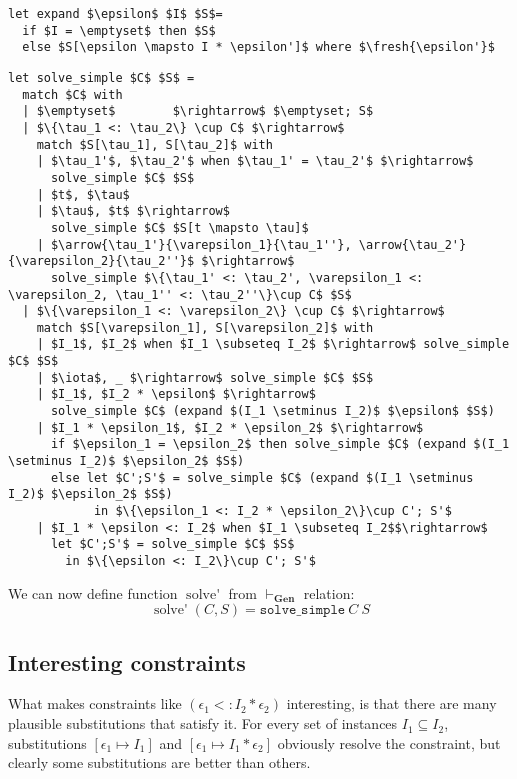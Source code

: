 \documentclass[declaration,shortabstract]{iithesis}
\theoremstyle{definition} \newtheorem{definition}{Definition}[section]
\newcommand{\arrow}[3]{{#1}\rightarrow_{#2}{#3}}
\newcommand{\fresh}[1]{\ensuremath{\operatorname{fresh}({#1})}}
\begin{document}
\begin{lstlisting}
let expand $\epsilon$ $I$ $S$= 
  if $I = \emptyset$ then $S$
  else $S[\epsilon \mapsto I * \epsilon']$ where $\fresh{\epsilon'}$
\end{lstlisting}
\begin{lstlisting}
let solve_simple $C$ $S$ = 
  match $C$ with
  | $\emptyset$        $\rightarrow$ $\emptyset; S$
  | $\{\tau_1 <: \tau_2\} \cup C$ $\rightarrow$
    match $S[\tau_1], S[\tau_2]$ with
    | $\tau_1'$, $\tau_2'$ when $\tau_1' = \tau_2'$ $\rightarrow$
      solve_simple $C$ $S$
    | $t$, $\tau$
    | $\tau$, $t$ $\rightarrow$
      solve_simple $C$ $S[t \mapsto \tau]$
    | $\arrow{\tau_1'}{\varepsilon_1}{\tau_1''}, \arrow{\tau_2'}{\varepsilon_2}{\tau_2''}$ $\rightarrow$
      solve_simple $\{\tau_1' <: \tau_2', \varepsilon_1 <: \varepsilon_2, \tau_1'' <: \tau_2''\}\cup C$ $S$
  | $\{\varepsilon_1 <: \varepsilon_2\} \cup C$ $\rightarrow$
    match $S[\varepsilon_1], S[\varepsilon_2]$ with
    | $I_1$, $I_2$ when $I_1 \subseteq I_2$ $\rightarrow$ solve_simple $C$ $S$
    | $\iota$, _ $\rightarrow$ solve_simple $C$ $S$
    | $I_1$, $I_2 * \epsilon$ $\rightarrow$
      solve_simple $C$ (expand $(I_1 \setminus I_2)$ $\epsilon$ $S$)
    | $I_1 * \epsilon_1$, $I_2 * \epsilon_2$ $\rightarrow$
      if $\epsilon_1 = \epsilon_2$ then solve_simple $C$ (expand $(I_1 \setminus I_2)$ $\epsilon_2$ $S$)
      else let $C';S'$ = solve_simple $C$ (expand $(I_1 \setminus I_2)$ $\epsilon_2$ $S$) 
            in $\{\epsilon_1 <: I_2 * \epsilon_2\}\cup C'; S'$
    | $I_1 * \epsilon <: I_2$ when $I_1 \subseteq I_2$$\rightarrow$
      let $C';S'$ = solve_simple $C$ $S$ 
        in $\{\epsilon <: I_2\}\cup C'; S'$
\end{lstlisting}

We can now define function $\operatorname{solve'}$ from $ \vdash_\textbf{Gen} $ relation:
$$ \operatorname{solve'}(C, S) = \texttt{solve\_simple}\:C\:S $$ 

\subsection{Interesting constraints}
What makes constraints like $(\epsilon_1 <: I_2 * \epsilon_2)$ interesting,
is that there are many plausible substitutions that satisfy it.
For every set of instances $I_1 \subseteq I_2$, substitutions $[\epsilon_1 \mapsto I_1]$ and
$[\epsilon_1 \mapsto I_1 * \epsilon_2]$ obviously resolve the constraint, but clearly some substitutions are better than others. 
\end{document}
